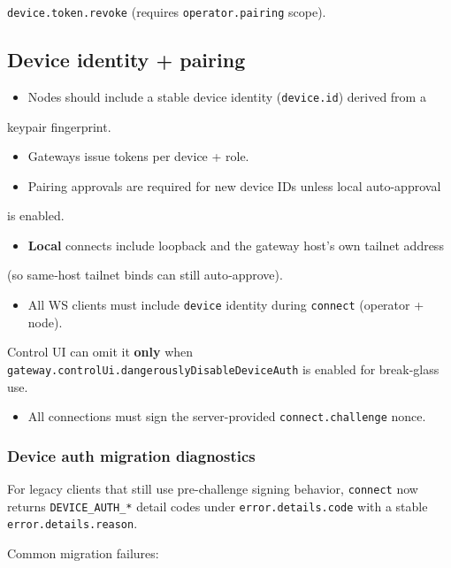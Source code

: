 \texttt{device.token.revoke} (requires \texttt{operator.pairing} scope).

\subsection{Device identity + pairing}


\begin{itemize}
  \item Nodes should include a stable device identity (\texttt{device.id}) derived from a
\end{itemize}

keypair fingerprint.
\begin{itemize}
  \item Gateways issue tokens per device + role.
  \item Pairing approvals are required for new device IDs unless local auto-approval
\end{itemize}

is enabled.
\begin{itemize}
  \item \textbf{Local} connects include loopback and the gateway host’s own tailnet address
\end{itemize}

(so same‑host tailnet binds can still auto‑approve).
\begin{itemize}
  \item All WS clients must include \texttt{device} identity during \texttt{connect} (operator + node).
\end{itemize}

Control UI can omit it \textbf{only} when \texttt{gateway.controlUi.dangerouslyDisableDeviceAuth}
is enabled for break-glass use.
\begin{itemize}
  \item All connections must sign the server-provided \texttt{connect.challenge} nonce.
\end{itemize}


\subsubsection{Device auth migration diagnostics}


For legacy clients that still use pre-challenge signing behavior, \texttt{connect} now returns
\texttt{DEVICE\_AUTH\_*} detail codes under \texttt{error.details.code} with a stable \texttt{error.details.reason}.

Common migration failures:


